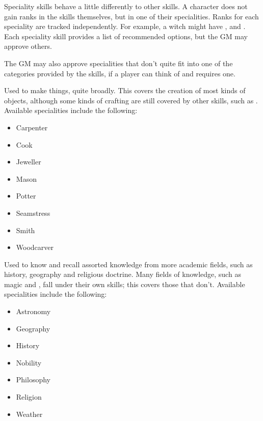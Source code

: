 Speciality skills behave a little differently to other skills.
A character does not gain ranks in the skills themselves, but in one of their specialities.
Ranks for each speciality are tracked independently.
For example, a witch might have ,  and .
Each speciality skill provides a list of recommended options, but the GM may approve others.

The GM may also approve specialities that don't quite fit into one of the categories provided by the skills, if a player can think of and requires one.


Used to make things, quite broadly.
This covers the creation of most kinds of objects, although some kinds of crafting are still covered by other skills, such as .
Available specialities include the following:

\begin{itemize}
	\item Carpenter
	\item Cook
	\item Jeweller
	\item Mason
	\item Potter
	\item Seamstress
	\item Smith
	\item Woodcarver
\end{itemize}


Used to know and recall assorted knowledge from more academic fields, such as history, geography and religious doctrine. %
Many fields of knowledge, such as magic and , fall under their own skills; this covers those that don't.
Available specialities include the following:

\begin{itemize}
	\item Astronomy
	\item Geography
	\item History
	\item Nobility
	\item Philosophy
	\item Religion %
	\item Weather
\end{itemize}


